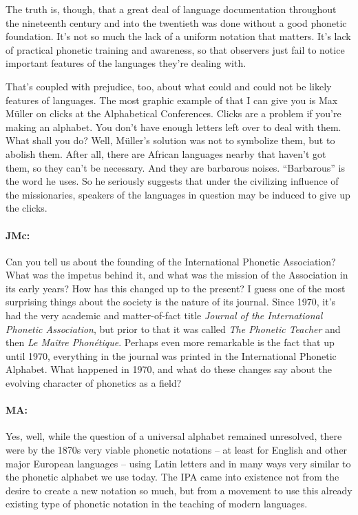 \documentclass[output=paper]{langscibook}
\begin{document}
The truth is, though, that a great deal of language documentation throughout the nineteenth century and into the twentieth was done without a good phonetic foundation. It’s not so much the lack of a uniform notation that matters. It’s lack of practical phonetic training and awareness, so that observers just fail to notice important features of the languages they’re dealing with. 

That’s coupled with prejudice, too, about what could and could not be likely features of languages. The most graphic example of that I can give you is Max Müller on clicks at the Alphabetical Conferences. Clicks are a problem if you’re making an alphabet. You don’t have enough letters left over to deal with them. What shall you do? Well, Müller’s solution was not to symbolize them, but to abolish them. After all, there are African languages nearby that haven’t got them, so they can’t be necessary. And they are barbarous noises. ``Barbarous'' is the word he uses. So he seriously suggests that under the civilizing influence of the missionaries, speakers of the languages in question may be induced to give up the clicks. 

\paragraph*{JMc:} Can you tell us about the founding of the International Phonetic Association? What was the impetus behind it, and what was the mission of the Association in its early years? How has this changed up to the present? I guess one of the most surprising things about the society is the nature of its journal.  Since 1970, it’s had the very academic and matter-of-fact title \textit{Journal of the International Phonetic Association}, but prior to that it was called \textit{The Phonetic Teacher} and then \textit{Le Maître Phonétique}. Perhaps even more remarkable is the fact that up until 1970, everything in the journal was printed in the International Phonetic Alphabet. What happened in 1970, and what do these changes say about the evolving character of phonetics as a field?

\paragraph*{MA:} Yes, well, while the question of a universal alphabet remained unresolved, there were by the 1870s very viable phonetic notations – at least for English and other major European languages – using Latin letters and in many ways very similar to the phonetic alphabet we use today. The IPA came into existence not from the desire to create a new notation so much, but from a movement to use this already existing type of phonetic notation in the teaching of modern languages.
\end{document}

